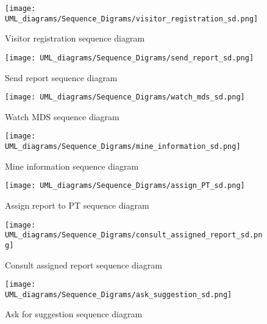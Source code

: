 \begin{figure}[H]
  \centering
  \texttt{[image: UML\_diagrams/Sequence\_Digrams/visitor\_registration\_sd.png]}
  \caption{Visitor registration sequence diagram}
  \label{fig:visitor_signup_sd}
\end{figure}

\begin{figure}[H]
  \centering
  \texttt{[image: UML\_diagrams/Sequence\_Digrams/send\_report\_sd.png]}
  \caption{Send report sequence diagram}
  \label{fig:send_report_sd}
\end{figure}

\begin{figure}[H]
  \centering
  \texttt{[image: UML\_diagrams/Sequence\_Digrams/watch\_mds\_sd.png]}
  \caption{Watch MDS sequence diagram}
  \label{fig:watch_mds_sd}
\end{figure}

\begin{figure}[H]
  \centering
  \texttt{[image: UML\_diagrams/Sequence\_Digrams/mine\_information\_sd.png]}
  \caption{Mine information sequence diagram}
  \label{fig:mine_information_sd}
\end{figure}

\begin{figure}[H]
  \centering
  \texttt{[image: UML\_diagrams/Sequence\_Digrams/assign\_PT\_sd.png]}
  \caption{Assign report to PT sequence diagram}
  \label{fig:assign_PT_sd}
\end{figure}

\begin{figure}[H]
  \centering
  \texttt{[image: UML\_diagrams/Sequence\_Digrams/consult\_assigned\_report\_sd.png]}
  \caption{Consult assigned report sequence diagram}
  \label{fig:consult_assigned_report_sd}
\end{figure}

\begin{figure}[H]
  \centering
  \texttt{[image: UML\_diagrams/Sequence\_Digrams/ask\_suggestion\_sd.png]}
  \caption{Ask for suggestion sequence diagram}
  \label{fig:ask_suggestion_sd}
\end{figure}

